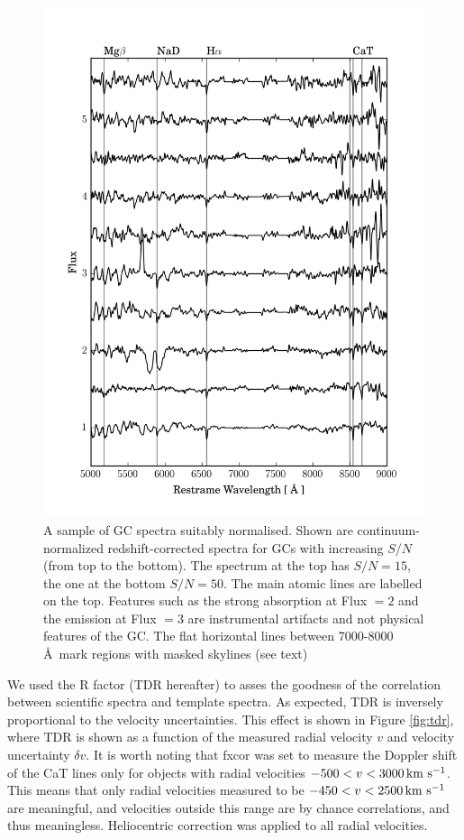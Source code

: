 \documentclass[useAMS,usenatbib]{mn2e}
\newcommand{\kms}{\mbox{\,km~s$^{-1}$}}
\begin{document}
\begin{figure}
\centering
\includegraphics[width=\columnwidth]{figures/vstack_spectra.png} 
\caption{A sample of GC spectra suitably normalised. Shown are continuum-normalized redshift-corrected spectra for GCs with increasing $S/N$ (from top to the bottom). The spectrum at the top has $S/N = 15$, the one at the bottom $S/N = 50$. The main atomic lines are labelled on the top. Features such as the strong absorption at Flux $= 2$ and the emission at Flux $=3$  are instrumental artifacts and not physical features of the GC. The flat horizontal lines between 7000-8000 \AA\ mark regions with masked skylines (see text)}
\label{fig:spectra}
\end{figure}

We used the \citet{Tonry79} R factor (TDR hereafter) to asses the goodness of the correlation between scientific spectra and template spectra. As expected, TDR is inversely proportional to the velocity uncertainties. This effect is shown in Figure \ref{fig:tdr}, where TDR is shown as a function of the measured radial velocity $v$ and velocity uncertainty $\delta v$. 
It is worth noting that fxcor was set to measure the Doppler shift of the CaT lines only for objects with radial velocities $-500 < v < 3000 \kms$. This means that only radial velocities measured to be $-450 < v < 2500 \kms$ are meaningful, and velocities outside this range are by chance correlations, and thus meaningless. Heliocentric correction was applied to all radial velocities. 
\end{document}
